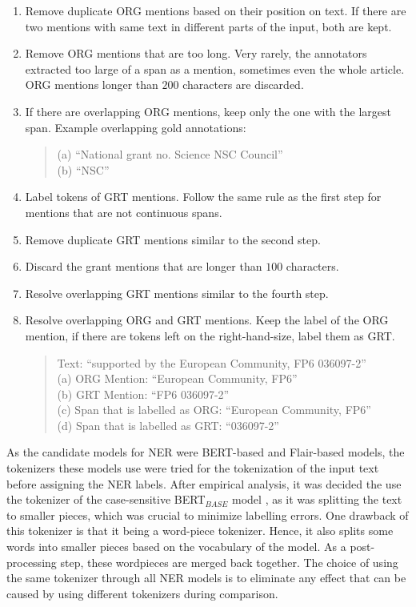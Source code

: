 \documentclass{report}
\theoremstyle{definition}
\theoremstyle{remark}
\begin{document}
\begin{enumerate}
    \item Remove duplicate ORG mentions based on their position on text. If there are two mentions with same text in different parts of the input, both are kept.
    \item Remove ORG mentions that are too long. Very rarely, the annotators extracted too large of a span as a mention, sometimes even the whole article. ORG mentions longer than $200$ characters are discarded.
    \item If there are overlapping ORG mentions, keep only the one with the largest span. Example overlapping gold annotations:
    \begin{quote}
        (a) ``National grant no. Science NSC Council'' \\
        (b) ``NSC''
    \end{quote}
    \item Label tokens of GRT mentions. Follow the same rule as the first step for mentions that are not continuous spans.
    \item Remove duplicate GRT mentions similar to the second step.
    \item Discard the grant mentions that are longer than $100$ characters. 
    \item Resolve overlapping GRT mentions similar to the fourth step.
    \item Resolve overlapping ORG and GRT mentions. Keep the label of the ORG mention, if there are tokens left on the right-hand-size, label them as GRT. 
    \begin{quote}
        Text: ``supported by the European Community, FP6 036097-2'' \\
        (a) ORG Mention: ``European Community, FP6'' \\
        (b) GRT Mention: ``FP6 036097-2'' \\
        (c) Span that is labelled as ORG: ``European Community, FP6'' \\
        (d) Span that is labelled as GRT: ``036097-2''
    \end{quote}
\end{enumerate}
    As the candidate models for NER were BERT-based \cite{BERT} and Flair-based \cite{flairpaper} models, the tokenizers these models use were tried for the tokenization of the input text before assigning the NER labels. After empirical analysis, it was decided the use the tokenizer of the case-sensitive BERT$_{BASE}$ model \cite{BERT}, as it was splitting the text to smaller pieces, which was crucial to minimize labelling errors. One drawback of this tokenizer is that it being a word-piece tokenizer. Hence, it also splits some words into smaller pieces based on the vocabulary of the model. As a post-processing step, these wordpieces are merged back together. The choice of using the same tokenizer through all NER models is to eliminate any effect that can be caused by using different tokenizers during comparison.
\end{document}
